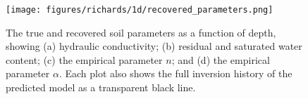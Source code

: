\begin{figure}[!htbp]
\begin{center}
\texttt{[image: figures/richards/1d/recovered\_parameters.png]}
\end{center}
\caption{
The true and recovered soil parameters as a function of depth, showing (a) hydraulic conductivity; (b) residual and saturated water content; (c) the empirical parameter $n$; and (d) the empirical parameter $\alpha$. Each plot also shows the full inversion history of the predicted model as a transparent black line.
}
\label{fig:richards-1d-recovered_parameters}
\end{figure}
